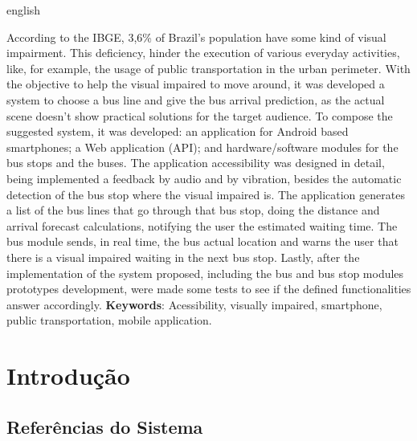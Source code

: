\documentclass[
	12pt,				%
	oneside,			%
	a4paper,			%
	brazil				%
]{abntex2}
\newcommand*{\BeginNoToc}{%
  \addtocontents{toc}{%
    \edef\protect\SavedTocDepth{\protect\the\protect\value{tocdepth}}%
  }%
  \addtocontents{toc}{%
    \protect\setcounter{tocdepth}{-10}%
  }%
}
\newcommand*{\EndNoToc}{%
  \addtocontents{toc}{%
    \protect\setcounter{tocdepth}{\protect\SavedTocDepth}%
  }%
}
\begin{document}
\begin{resumo}[Abstract] 
\begin{otherlanguage*}{english}

According to the IBGE, 3,6\% of Brazil's population have some kind of visual impairment. This deficiency, hinder the execution of various everyday activities, like, for example, the usage of public transportation in the urban perimeter. With the objective to help the visual impaired to move around, it was developed a system to choose a bus line and give the bus arrival prediction, as the actual scene doesn't show practical solutions for the target audience. To compose the suggested system, it was developed: an application for Android based smartphones; a Web application (API); and hardware/software modules for the bus stops and the buses. The application accessibility was designed in detail, being implemented
a feedback by audio and by vibration, besides the automatic detection of the bus stop where the visual impaired is. The application generates a list of the bus lines that go through that bus stop, doing the distance and arrival forecast calculations, notifying the user the estimated waiting time. The bus module sends, in real time, the bus actual location and warns the user that there is a visual impaired waiting in the next bus stop. Lastly, after the implementation of the system proposed, including the bus and bus stop modules prototypes development, were made some tests to see if the defined functionalities answer accordingly.
\vspace{\onelineskip} 
\noindent \textbf{Keywords}: Acessibility, visually impaired, smartphone, public transportation, mobile application. 
\end{otherlanguage*} 
\end{resumo} 

\BeginNoToc
\tableofcontents*
\newpage
\listoffigures
\EndNoToc

\textual

\chapter{Introdução}

\section{Referências do Sistema}
\end{document}
